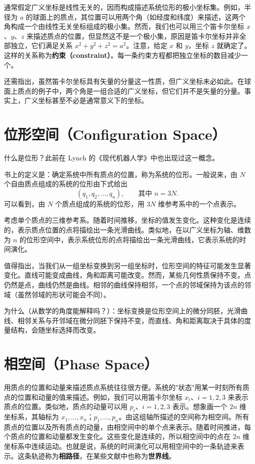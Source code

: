 通常假定广义坐标是线性无关的，因而构成描述系统位形的极小坐标集。例如，半径为 $a$ 的球面上的质点，其位置可以用两个角（如经度和纬度）来描述，这两个角构成一个由线性无关坐标组成的极小集。然而，我们也可以用三个笛卡尔坐标 $x$、$y$、$z$ 来描述质点的位置，但显然这不是一个极小集，原因是笛卡尔坐标并非全部独立，它们满足关系 $x^2 + y^2 + z^2 = a^2$。注意，给定 $x$ 和 $y$，坐标 $z$ 就确定了。这样的关系称为\textbf{约束（constraint）}。每一条约束方程都把独立坐标的数目减少一个。

还需指出，虽然笛卡尔坐标具有矢量的分量这一性质，但广义坐标未必如此。在球面上质点的例子中，两个角是一组合适的广义坐标，但它们并不是矢量的分量。事实上，广义坐标甚至不必是通常意义下的坐标。

\section{位形空间（Configuration Space）}
什么是位形？此前在 Lynch 的《现代机器人学》中也出现过这一概念。

书上的定义是：确定系统中所有质点的位置，称为系统的位形。一般说来，由 $N$ 个自由质点组成的系统的位形由下式给出
\begin{equation}\label{eq:cs}
(q_1, q_2, \ldots, q_n), \qquad \text{其中 } n = 3N.
\end{equation}
可以看到，由 $N$ 个质点组成的系统的位形，用 $3N$ 维参考系中的一个点表示。

考虑单个质点的三维参考系。随着时间推移，坐标的值发生变化。这种变化是连续的，表示质点位置的点将描绘出一条光滑曲线。类似地，在以广义坐标为轴、维数为 $n$ 的位形空间中，表示系统位形的点将描绘出一条光滑曲线，它表示系统的时间演化。

值得指出，当我们从一组坐标变换到另一组坐标时，位形空间的特征可能发生显著变化。直线可能变成曲线，角和距离可能改变。然而，某些几何性质保持不变。点仍然是点，曲线仍然是曲线。相邻的曲线保持相邻，一个点的邻域保持为该点的邻域（虽然邻域的形状可能会不同）。

\begin{remark}
为什么（从数学的角度能解释吗？）：坐标变换是位形空间上的微分同胚，光滑曲线、相邻关系与开邻域在微分同胚下保持不变，而直线、角和距离取决于具体的度量结构，会随坐标选择而改变。
\end{remark}

\section{相空间（Phase Space）}
用质点的位置和动量来描述质点系统往往很方便。系统的"状态"用某一时刻所有质点的位置和动量的值来描述。例如，我们可以用笛卡尔坐标 $x_i$、$i = 1, 2, 3$ 来表示质点的位置。类似地，质点的动量可以用 $p_i$、$i = 1, 2, 3$ 表示。想象画一个 $2n$ 维坐标系，其轴标为 $x_1, \ldots, x_n$；$p_1, \ldots, p_n$。由这组轴所描述的空间称为相空间。所有质点的位置以及所有质点的动量，由相空间中的单个点来表示。随着时间推进，每个质点的位置和动量都发生变化。这些变化是连续的，所以相空间中的点在 $2n$ 维坐标系中连续运动。也就是说，系统的时间演化可以用相空间中的一条轨迹来表示。这条轨迹称为\textbf{相路径}，在某些文献中也称为\textbf{世界线}。

